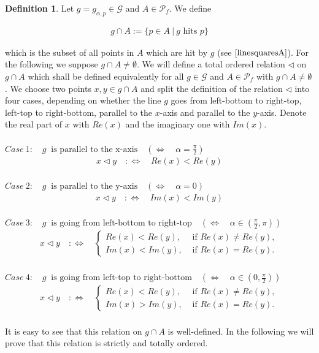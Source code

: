 \documentclass[12pt,a4paper]{scrartcl}
\numberwithin{equation}{subsection}
\newcommand{\1}{\mathbbm{1}}
\newcommand{\G}{\mathcal{G}}
\numberwithin{equation}{section}
\theoremstyle{definition}
\newtheorem{definition}{Definition}[subsection]
\begin{document}
\begin{definition}
	Let $g=g_{\alpha,p}\in \G$ and $A\in \mathcal{P}_f$. We define 
	
	\begin{align*}
		g\cap A := \{ p\in A\ |\ g \text{ hits } p\}
	\end{align*}
	
	which is the subset of all points in $A$ which are hit by $g$ (see $\autoref{linesquaresA}$). For the following we suppose $g\cap A \neq \emptyset$. We will define a total ordered relation $\triangleleft$ on $g\cap A$ which shall be defined equivalently for all $g\in \G$ and $A\in\mathcal{P}_f$ with $g\cap A \neq\emptyset$. We choose two points $x,y\in g\cap A$ and split the definition of the relation $\triangleleft$ into four cases, depending on whether the line $g$ goes from left-bottom to right-top, left-top to right-bottom, parallel to the $x$-axis and parallel to the $y$-axis. Denote the real part of $x$ with $Re(x)$ and the imaginary one with $Im(x)$. \\
	\\
	$\mathit{Case}\ 1:\quad g\ \text{ is parallel to the x-axis}\quad (\Leftrightarrow\quad \alpha = \frac{\pi}{2})$
	\begin{align*}
	x \triangleleft y \quad :\Leftrightarrow \quad Re(x) < Re(y)
	\end{align*}\\
	$\mathit{Case}\ 2:\quad g\ \text{ is parallel to the y-axis}\quad (\Leftrightarrow\quad \alpha = 0)$
	\begin{align*}
	x \triangleleft y \quad :\Leftrightarrow \quad Im(x) < Im(y)
	\end{align*}\\
	$\mathit{Case}\ 3:\quad g\ \text{ is going from left-bottom to right-top}\quad (\Leftrightarrow\quad \alpha\in (\frac{\pi}{2},\pi))$
	\begin{align*}
	x \triangleleft y \quad :\Leftrightarrow \quad
		\begin{cases}
			Re(x) < Re(y), & \text{ if } Re(x) \neq Re(y), \\
			Im(x) < Im(y), & \text{ if } Re(x) = Re(y).
		\end{cases}
	\end{align*}\\
	$\mathit{Case}\ 4:\quad g\ \text{ is going from left-top to right-bottom}\quad (\Leftrightarrow\quad \alpha\in (0,\frac{\pi}{2}))$
	\begin{align*}
	x \triangleleft y \quad :\Leftrightarrow \quad
	\begin{cases}
	Re(x) < Re(y), & \text{ if } Re(x) \neq Re(y), \\
	Im(x) > Im(y), & \text{ if } Re(x) = Re(y).
	\end{cases}
	\end{align*}\\
	It is easy to see that this relation on $g\cap A$ is well-defined. In the following we will prove that this relation is strictly and totally ordered. 
\end{definition}
\end{document}
